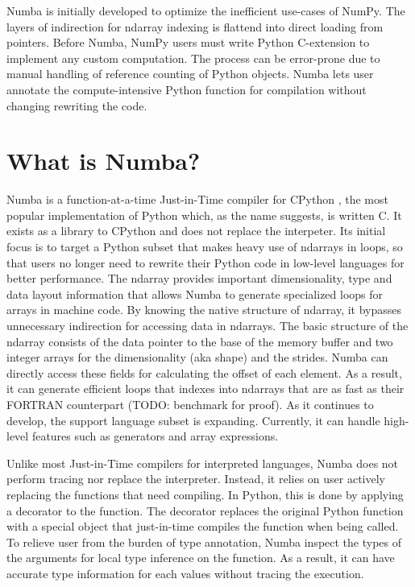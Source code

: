 \documentclass{acm_proc_article-sp}
\begin{document}
Numba is initially developed to optimize the inefficient use-cases of NumPy.
The layers of indirection for ndarray indexing is flattend into direct loading
from pointers.  Before Numba, NumPy users must write Python C-extension to
implement any custom computation.  The process can be error-prone due to manual
handling of reference counting of Python objects. Numba lets user annotate
the compute-intensive Python function for compilation without changing rewriting
the code.

\section{What is Numba?}

Numba is a function-at-a-time Just-in-Time compiler for CPython
\cite{wikipedia:cpython}, the most popular implementation of Python which,
as the name suggests, is written C.
It exists as a library to CPython and does not replace the interpeter.
Its initial focus is to target a Python subset that makes heavy use of
ndarrays in loops, so that users no longer need to rewrite their Python code in
low-level languages for better performance.
The ndarray provides important dimensionality, type and data layout information
that allows Numba to generate specialized  loops for arrays in machine code.
By knowing the native structure of ndarray,
it bypasses unnecessary indirection for accessing data in ndarrays.
The basic structure of the ndarray consists of the data pointer to the base of
the memory buffer and two integer arrays for the dimensionality (aka shape) and
the strides. Numba can directly access these fields for calculating the offset
of each element.  As a result, it can generate efficient loops that indexes
into ndarrays that are as fast as their FORTRAN counterpart
(TODO: benchmark for proof). As it continues to develop, the support language
subset is expanding. Currently, it can handle high-level features such as
generators and array expressions.

Unlike most Just-in-Time compilers for interpreted languages, Numba does not
perform tracing nor replace the interpreter.
Instead, it relies on user actively replacing the functions that need compiling.
In Python, this is done by applying a decorator to the function.
The decorator replaces the original Python function with a special object
that just-in-time compiles the function when being called.
To relieve user from the burden of type annotation, Numba inspect the types
of the arguments for local type inference on the function.
As a result, it can have accurate type information for each values without
tracing the execution.
\end{document}
